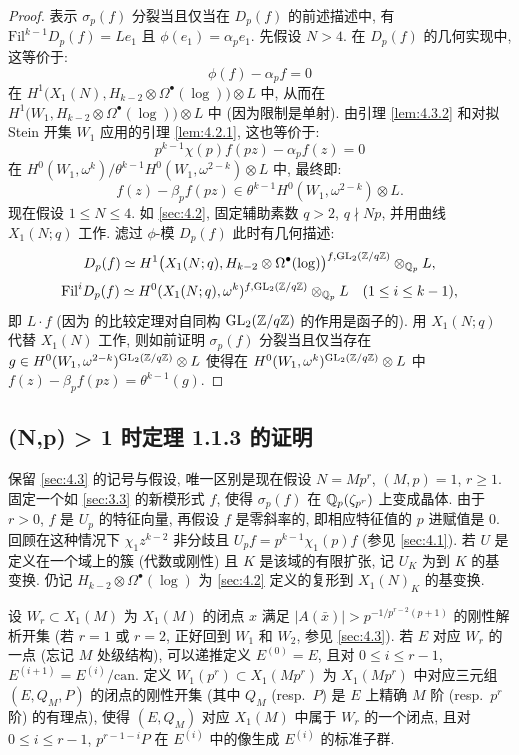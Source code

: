 \begin{proof}
表示 $\sigma_p(f)$ 分裂当且仅当在 $D_p(f)$ 的前述描述中, 有 $\mathrm{Fil}^{k-1}D_p(f) = Le_1$ 且 $\phi(e_1) = \alpha_p e_1$.
先假设 $N > 4$.
在 $D_p(f)$ 的几何实现中, 这等价于:
\[
\phi(f) - \alpha_p f = 0
\]
在 $H^{1}\bigl(X_1(N),H_{k-2} \otimes \Omega^{\bullet}(\log)\bigr) \otimes L$ 中, 从而在 $H^{1}\bigl(W_1,H_{k-2} \otimes \Omega^{\bullet}(\log)\bigr) \otimes L$ 中 (因为限制是单射).
由引理 \ref{lem:4.3.2} 和对拟 Stein 开集 $W_1$ 应用的引理 \ref{lem:4.2.1}, 这也等价于:
\[
p^{k-1}\chi(p)f(pz) - \alpha_p f(z) = 0
\]
在 $H^{0}(W_1,\omega^{k})/\theta^{k-1}H^{0}(W_1,\omega^{2-k}) \otimes L$ 中, 最终即:
\[
f(z) - \beta_p f(pz) \in \theta^{k-1}H^{0}(W_1,\omega^{2-k}) \otimes L.
\]
现在假设 $1 \le N \le 4$.
如 \ref{sec:4.2}, 固定辅助素数 $q > 2$, $q \nmid Np$, 并用曲线 $X_1(N;q)$ 工作.
滤过 $\phi$-模 $D_p(f)$ 此时有几何描述:
\[
D_p(f) \simeq H^{1}\bigl(X_1(N;q),H_{k-2} \otimes \Omega^{\bullet}(\log)\bigr)^{f,\mathrm{GL}_2(\mathbb{Z}/q\mathbb{Z})} \otimes_{\mathbb{Q}_p} L,
\]
\[
\mathrm{Fil}^{i}D_p(f) \simeq H^{0}(X_1(N;q),\omega^{k})^{f,\mathrm{GL}_2(\mathbb{Z}/q\mathbb{Z})} \otimes_{\mathbb{Q}_p} L \quad (1 \le i \le k-1),
\]
即 $L \cdot f$ (因为 \cite{ref:29} 的比较定理对自同构 $\mathrm{GL}_2(\mathbb{Z}/q\mathbb{Z})$ 的作用是函子的).
用 $X_1(N;q)$ 代替 $X_1(N)$ 工作, 则如前证明 $\sigma_p(f)$ 分裂当且仅当存在 $g \in H^{0}(W_1,\omega^{2-k})^{\mathrm{GL}_2(\mathbb{Z}/q\mathbb{Z})} \otimes L$ 使得在 $H^{0}(W_1,\omega^{k})^{\mathrm{GL}_2(\mathbb{Z}/q\mathbb{Z})} \otimes L$ 中 $f(z) - \beta_p f(pz) = \theta^{k-1}(g)$.
\end{proof}

\subsection{(N,p) > 1 时定理 1.1.3 的证明}\label{sec:4.4}

保留 \ref{sec:4.3} 的记号与假设, 唯一区别是现在假设 $N = Mp^{r}$, $(M,p) = 1$, $r \ge 1$.
固定一个如 \ref{sec:3.3} 的新模形式 $f$, 使得 $\sigma_p(f)$ 在 $\mathbb{Q}_p(\zeta_{p^{r}})$ 上变成晶体.
由于 $r > 0$, $f$ 是 $U_p$ 的特征向量, 再假设 $f$ 是零斜率的, 即相应特征值的 $p$ 进赋值是 $0$.
回顾在这种情况下 $\chi_1z^{k-2}$ 非分歧且 $U_p f = p^{k-1}\chi_1(p)f$ (参见 \ref{sec:4.1}).
若 $U$ 是定义在一个域上的簇 (代数或刚性) 且 $K$ 是该域的有限扩张, 记 $U_K$ 为到 $K$ 的基变换.
仍记 $H_{k-2} \otimes \Omega^{\bullet}(\log)$ 为 \ref{sec:4.2} 定义的复形到 $X_1(N)_K$ 的基变换.

设 $W_r \subset X_1(M)$ 为 $X_1(M)$ 的闭点 $x$ 满足 $|A(\bar{x})| > p^{-1/p^{r-2}(p+1)}$ 的刚性解析开集 (若 $r = 1$ 或 $r = 2$, 正好回到 $W_1$ 和 $W_2$, 参见 \ref{sec:4.3}).
若 $E$ 对应 $W_r$ 的一点 (忘记 $M$ 处级结构), 可以递推定义 $E^{(0)} = E$, 且对 $0 \le i \le r-1$, $E^{(i+1)} = E^{(i)}/\mathrm{can}$.
定义 $W_1(p^{r}) \subset X_1(Mp^{r})$ 为 $X_1(Mp^{r})$ 中对应三元组 $(E,Q_M,P)$ 的闭点的刚性开集 (其中 $Q_M$ (resp.\ $P$) 是 $E$ 上精确 $M$ 阶 (resp.\ $p^{r}$ 阶) 的有理点), 使得 $(E,Q_M)$ 对应 $X_1(M)$ 中属于 $W_r$ 的一个闭点, 且对 $0 \le i \le r-1$, $p^{r-1-i}P$ 在 $E^{(i)}$ 中的像生成 $E^{(i)}$ 的标准子群.

